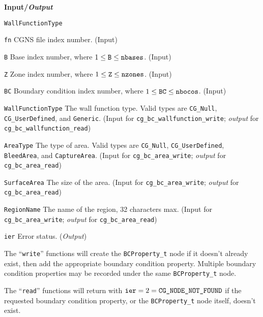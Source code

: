 \noindent
\textbf{\textcolor{input}{Input}/\textcolor{output}{\textit{Output}}}

\begin{Ventryi}{\texttt{WallFunctionType}}\raggedright
\item [\texttt{fn}]
      CGNS file index number.
      (\textcolor{input}{Input})
\item [\texttt{B}]
      Base index number, where $1 \leq \text{\texttt{B}} \leq \text{\texttt{nbases}}$.
      (\textcolor{input}{Input})
\item [\texttt{Z}]
      Zone index number, where $1 \leq \text{\texttt{Z}} \leq \text{\texttt{nzones}}$.
      (\textcolor{input}{Input})
\item [\texttt{BC}]
      Boundary condition index number, where $1 \leq \text{\texttt{BC}} \leq \text{\texttt{nbocos}}$.
      (\textcolor{input}{Input})
\item [\texttt{WallFunctionType}]
      The wall function type.
      Valid types are \texttt{CG\_Null}, \texttt{CG\_UserDefined}, and \texttt{Generic}.
      (\textcolor{input}{Input} for \texttt{cg\_bc\_wallfunction\_write};
      \textcolor{output}{\textit{output}} for
      \texttt{cg\_bc\_wallfunction\_read})
\item [\texttt{AreaType}]
      The type of area.
      Valid types are \texttt{CG\_Null}, \texttt{CG\_UserDefined}, \texttt{BleedArea},
      and \texttt{CaptureArea}.
      (\textcolor{input}{Input} for \texttt{cg\_bc\_area\_write};
      \textcolor{output}{\textit{output}} for \texttt{cg\_bc\_area\_read})
\item [\texttt{SurfaceArea}]
      The size of the area.
      (\textcolor{input}{Input} for \texttt{cg\_bc\_area\_write};
      \textcolor{output}{\textit{output}} for \texttt{cg\_bc\_area\_read})
\item [\texttt{RegionName}]
      The name of the region, 32 characters max.
      (\textcolor{input}{Input} for \texttt{cg\_bc\_area\_write};
      \textcolor{output}{\textit{output}} for \texttt{cg\_bc\_area\_read})
\item [\texttt{ier}]
      Error status.
      (\textcolor{output}{\textit{Output}})
\end{Ventryi}

The ``\texttt{write}'' functions will create the \texttt{BCProperty\_t}
node if it doesn't already exist, then add the appropriate boundary
condition property.
Multiple boundary condition properties may be recorded under the same
\texttt{BCProperty\_t} node.

The ``\texttt{read}'' functions will return with $\text{\texttt{ier}} = 2 =
\text{\texttt{CG\_NODE\_NOT\_FOUND}}$ if the requested boundary condition
property, or the \texttt{BCProperty\_t} node itself, doesn't exist.
